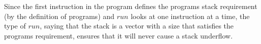 Since the first instruction in the program defines the programs stack requirement (by the definition of programs) and $run$ looks at one instruction at a time, the type of $run$, saying that the stack is a vector with a size that satisfies the programs requirement, ensures that it will never cause a stack underflow.